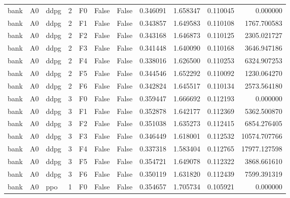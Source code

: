 \begin{tabular}{lllrlllrrrr}
      bank &      A0 &      ddpg &     2 &  F0 &           False &            False &  0.346091 &  1.658347 & 0.110045 &         0.000000 \\
      bank &      A0 &      ddpg &     2 &  F1 &           False &            False &  0.343857 &  1.649583 & 0.110108 &      1767.700583 \\
      bank &      A0 &      ddpg &     2 &  F2 &           False &            False &  0.343168 &  1.646873 & 0.110125 &      2305.021727 \\
      bank &      A0 &      ddpg &     2 &  F3 &           False &            False &  0.341448 &  1.640090 & 0.110168 &      3646.947186 \\
      bank &      A0 &      ddpg &     2 &  F4 &           False &            False &  0.338016 &  1.626500 & 0.110253 &      6324.907253 \\
      bank &      A0 &      ddpg &     2 &  F5 &           False &            False &  0.344546 &  1.652292 & 0.110092 &      1230.064270 \\
      bank &      A0 &      ddpg &     2 &  F6 &           False &            False &  0.342824 &  1.645517 & 0.110134 &      2573.564180 \\
      bank &      A0 &      ddpg &     3 &  F0 &           False &            False &  0.359447 &  1.666692 & 0.112193 &         0.000000 \\
      bank &      A0 &      ddpg &     3 &  F1 &           False &            False &  0.352878 &  1.642177 & 0.112369 &      5362.500870 \\
      bank &      A0 &      ddpg &     3 &  F2 &           False &            False &  0.351038 &  1.635273 & 0.112415 &      6854.276405 \\
      bank &      A0 &      ddpg &     3 &  F3 &           False &            False &  0.346449 &  1.618001 & 0.112532 &     10574.707766 \\
      bank &      A0 &      ddpg &     3 &  F4 &           False &            False &  0.337318 &  1.583404 & 0.112765 &     17977.127598 \\
      bank &      A0 &      ddpg &     3 &  F5 &           False &            False &  0.354721 &  1.649078 & 0.112322 &      3868.661610 \\
      bank &      A0 &      ddpg &     3 &  F6 &           False &            False &  0.350119 &  1.631820 & 0.112439 &      7599.391319 \\
      bank &      A0 &       ppo &     1 &  F0 &           False &            False &  0.354657 &  1.705734 & 0.105921 &         0.000000 \\

\end{tabular}
